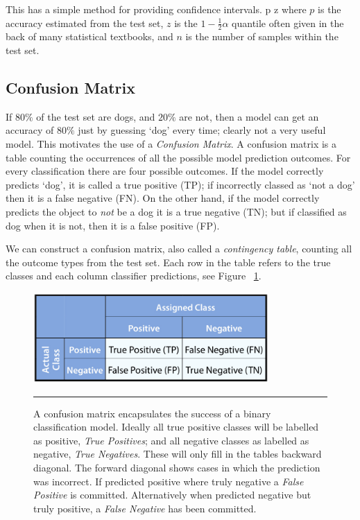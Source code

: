 This has a simple method for providing confidence intervals\citep{witten2005data}.
\be
p \pm z 
\ee
where $p$ is the accuracy estimated from the test set, $z$ is the $1 - \frac{1}{2}\alpha$ quantile often given in the back of many statistical textbooks, and $n$ is the number of samples within the test set.

\subsection{Confusion Matrix} 
If $80\%$ of the test set are dogs, and $20\%$ are not, then a model can get an accuracy of $80\%$ just by guessing `dog' every time; clearly not a very useful model.
This motivates the use of a \textit{Confusion Matrix}.
A confusion matrix is a table counting the occurrences of all the possible model prediction outcomes.
For every classification there are four possible outcomes.
If the model correctly predicts `dog', it is called a true positive (TP); if incorrectly classed as `not a dog' then it is a false negative (FN).
On the other hand, if the model correctly predicts the object to \textit{not} be a dog it is a true negative (TN); but if classified as dog when it is not, then it is a false positive (FP).

We can construct a confusion matrix, also called a \textit{contingency table}, counting all the outcome types from the test set.
Each row in the table refers to the true classes and each column classifier predictions\citep{flach2012machine}, see Figure ~\ref{fig:Confusion_matrix_2}.
\begin{figure}[htbp]
	\centering
		\includegraphics[width = 0.8\textwidth]{./Figures/encyplopedia_of_machine_learning_confusion_matrix.jpg}
		\rule{35em}{0.5pt}
	\caption[Confusion Matrix]{A confusion matrix encapsulates the success of a binary classification model. Ideally all true positive classes will be labelled as positive, \textit{True Positives}; and all negative classes as labelled as negative, \textit{True Negatives}. These will only fill in the tables backward diagonal. The forward diagonal shows cases in which the prediction was incorrect. If predicted positive where truly negative a \textit{False Positive} is committed. Alternatively when predicted negative but truly positive, a \textit{False Negative} has been committed.}
	\label{fig:Confusion_matrix_2}
\end{figure}

